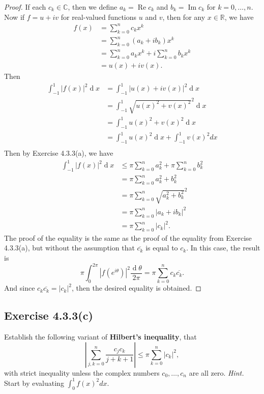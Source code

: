 \documentclass[12pt]{article}
\newenvironment{problem}
    {\begin{lrbox}{\mybox}\begin{minipage}{0.98\textwidth}}
    {\end{minipage}\end{lrbox}\framebox[\textwidth]{\usebox{\mybox}}}
\newcommand{\R}{\mathbb{R}} %
\newcommand{\C}{\mathbb{C}} %
\newcommand{\<}{\left\langle} %
\renewcommand{\>}{\right\rangle} %
\renewcommand{\Im}{\operatorname{Im}} %
\renewcommand{\Re}{\operatorname{Re}} %
\renewcommand{\d}[1]{\operatorname{d}\!#1} %
\let\conj\overline %
\begin{document}
\begin{proof}
    If each $c_k \in \C$, then we define $a_k = \Re c_k$ and $b_k = \Im c_k$ for $k = 0, \dots, n$. Now if $f = u + iv$ for real-valued functions $u$ and $v$, then for any $x \in \R$, we have
    \begin{align*}
        f(x)
            &= \sum_{k=0}^n c_k x^k \\
            &= \sum_{k=0}^n (a_k + ib_k) x^k \\
            &= \sum_{k=0}^n a_kx^k + i\sum_{k=0}^n b_k x^k \\
            &= u(x) + i v(x).
    \end{align*}
    Then
    \begin{align*}
        \int_{-1}^1 |f(x)|^2 \d{x} 
            &= \int_{-1}^1 |u(x) + iv(x)|^2 \d{x}  \\
            &= \int_{-1}^1 \sqrt{u(x)^2 + v(x)^2}^2 \d{x}  \\
            &= \int_{-1}^1 u(x)^2 + v(x)^2 \d{x} \\
            &= \int_{-1}^1 u(x)^2 \d{x}+ \int_{-1}^1 v(x)^2 dx \\
    \end{align*}
    Then by Exercise 4.3.3(a), we have
    \allowdisplaybreaks
    \begin{align*}
        \int_{-1}^1 |f(x)|^2 \d{x} 
            &\leq \pi \sum_{k=0}^n a_k^2 + \pi \sum_{k=0}^n b_k^2 \\
            &= \pi \sum_{k=0}^n a_k^2 + b_k^2 \\
            &= \pi \sum_{k=0}^n \sqrt{a_k^2 + b_k^2}^2 \\
            &= \pi \sum_{k=0}^n |a_k + ib_k|^2 \\
            &= \pi \sum_{k=0}^n |c_k|^2.
    \end{align*}
    The proof of the equality is the same as the proof of the equality from Exercise 4.3.3(a), but without the assumption that $\conj{c_k}$ is equal to $c_k$. In this case, the result is
    \[\pi \int_0^{2\pi}|f(e^{i\theta})|^2 \frac{\d{\theta}}{2\pi} = \pi \sum_{k=0}^n c_k\conj{c_k}.\]
    And since $c_k\conj{c_k} = |c_k|^2$, then the desired equality is obtained.
    
    
\end{proof}

\subsection*{Exercise 4.3.3(c)}
\begin{problem}
    Establish the following variant of \textbf{Hilbert's inequality}, that
    \[\left|\sum_{j,k=0}^n \frac{c_jc_k}{j+k+1}\right| \leq \pi \sum_{k=0}^n|c_k|^2,\]
    with strict inequality unless the complex numbers $c_0,\dots,c_n$ are all zero. \emph{Hint.} Start by evaluating $\int_0^1f(x)^2 dx$.
\end{problem}
\end{document}

